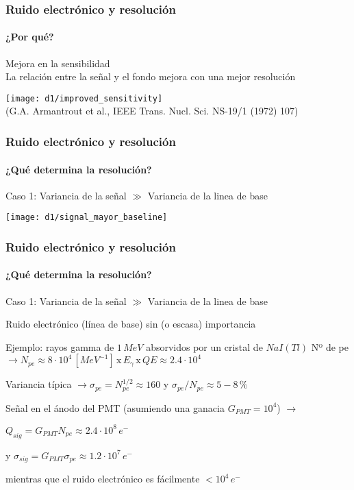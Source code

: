 \documentclass{beamer}
\begin{document}
\begin{frame}
\frametitle{Ruido electr\'onico y resoluci\'on}
\framesubtitle{¿Por qu\'e?}
{\color{blue}Mejora en la sensibilidad} \\
\small{La relaci\'on entre la señal y el fondo mejora con una mejor resoluci\'on}
\begin{center}
\texttt{[image: d1/improved\_sensitivity]} \\
\tiny{(G.A. Armantrout et al., IEEE Trans. Nucl. Sci. NS-19/1 (1972) 107)}
\end{center}
\end{frame} 

\begin{frame}
\frametitle{Ruido electr\'onico y resoluci\'on}
\framesubtitle{¿Qu\'e determina la resoluci\'on?}
{\color{blue}Caso 1: Variancia de la señal $\gg$ Variancia de la linea de base} 
\begin{center}
\texttt{[image: d1/signal\_mayor\_baseline]} 
\end{center}
\end{frame} 

\begin{frame}
\frametitle{Ruido electr\'onico y resoluci\'on}
\framesubtitle{¿Qu\'e determina la resoluci\'on?}
{\color{blue}Caso 1: Variancia de la señal $\gg$ Variancia de la linea de base} 
\begin{alertblock}{}
Ruido electr\'onico (l\'inea de base) sin (o escasa) importancia
\end{alertblock}
\begin{block}{Ejemplo: \footnotesize{rayos gamma de $1\,MeV$ absorvidos por un cristal de $NaI(Tl)$}}
Nº de pe $\rightarrow N_{pe} \approx
8\cdot10^4\,[MeV^{-1}]\,\text{x}\,E_{\gamma}\,\text{x}\,QE \approx 2.4\cdot10^4$

\vspace{1mm}
Variancia t\'ipica $\rightarrow \sigma_{pe} = N_{pe}^{1/2} \approx 160$ y
$\sigma_{pe}/N_{pe} \approx 5 - 8\,\%$ 

\vspace{1mm}
Señal en el \'anodo del PMT (asumiendo una ganacia $G_{PMT} = 10^4$) $\rightarrow$  
\begin{center}
$Q_{sig} = G_{PMT}N_{pe} \approx 2.4\cdot10^8\,e^-$  

\vspace{1mm}
y $\sigma_{sig} = G_{PMT}\sigma_{pe}
\approx 1.2\cdot10^7\,e^-$ 
\end{center}

\alert{mientras que el ruido electr\'onico es f\'acilmente $< 10^4\, e^-$}
\end{block}
\end{frame} 
\end{document}
